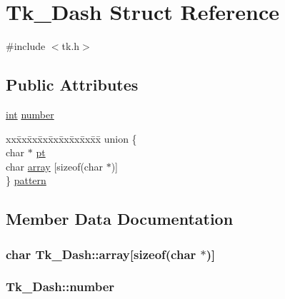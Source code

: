 \hypertarget{struct_tk___dash}{}\section{Tk\+\_\+\+Dash Struct Reference}
\label{struct_tk___dash}


{\ttfamily \#include $<$tk.\+h$>$}

\subsection*{Public Attributes}
\begin{DoxyCompactItemize}
\item 
\hyperlink{tk_8h_a83f82f76e7fed06f4c49d2db94028a6d}{int} \hyperlink{struct_tk___dash_ab85451ac5b95c1d7007f48b761f11869}{number}
\item 
\begin{tabbing}
xx\=xx\=xx\=xx\=xx\=xx\=xx\=xx\=xx\=\kill
union \{\\
\>char $\ast$ \hyperlink{struct_tk___dash_af91bddbb52ea7c859c39ef6a566386bb}{pt}\\
\>char \hyperlink{struct_tk___dash_ab742573724fff29cccf795cd12eba93e}{array} \mbox{[}sizeof(char $\ast$)\mbox{]}\\
\} \hyperlink{struct_tk___dash_ad7f17cc62138295d531b0484909cffaf}{pattern}\\

\end{tabbing}\end{DoxyCompactItemize}


\subsection{Member Data Documentation}
\subsubsection[{\texorpdfstring{array}{array}}]{\setlength{\rightskip}{0pt plus 5cm}char Tk\+\_\+\+Dash\+::array\mbox{[}sizeof(char $\ast$)\mbox{]}}\hypertarget{struct_tk___dash_ab742573724fff29cccf795cd12eba93e}{}\label{struct_tk___dash_ab742573724fff29cccf795cd12eba93e}
\subsubsection[{\texorpdfstring{number}{number}}]{ Tk\+\_\+\+Dash\+::number}\hypertarget{struct_tk___dash_ab85451ac5b95c1d7007f48b761f11869}{}\label{struct_tk___dash_ab85451ac5b95c1d7007f48b761f11869}
